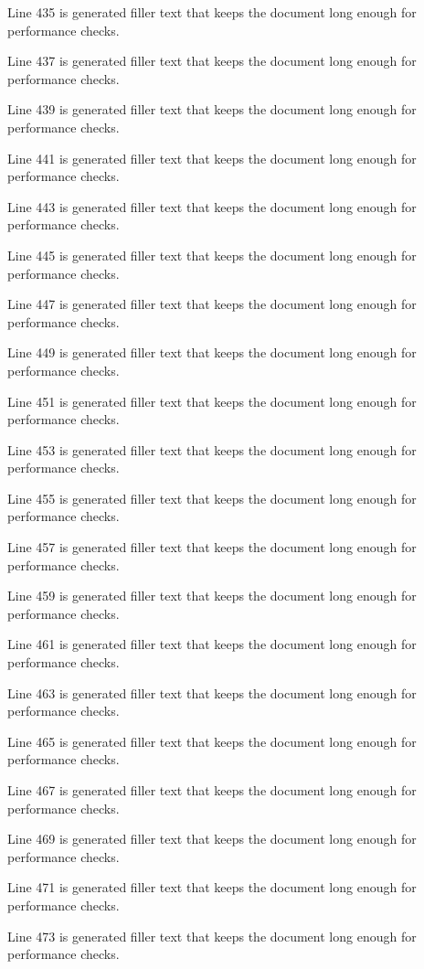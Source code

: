 Line 435 is generated filler text that keeps the document long enough for performance checks.

Line 437 is generated filler text that keeps the document long enough for performance checks.

Line 439 is generated filler text that keeps the document long enough for performance checks.

Line 441 is generated filler text that keeps the document long enough for performance checks.

Line 443 is generated filler text that keeps the document long enough for performance checks.

Line 445 is generated filler text that keeps the document long enough for performance checks.

Line 447 is generated filler text that keeps the document long enough for performance checks.

Line 449 is generated filler text that keeps the document long enough for performance checks.

Line 451 is generated filler text that keeps the document long enough for performance checks.

Line 453 is generated filler text that keeps the document long enough for performance checks.

Line 455 is generated filler text that keeps the document long enough for performance checks.

Line 457 is generated filler text that keeps the document long enough for performance checks.

Line 459 is generated filler text that keeps the document long enough for performance checks.

Line 461 is generated filler text that keeps the document long enough for performance checks.

Line 463 is generated filler text that keeps the document long enough for performance checks.

Line 465 is generated filler text that keeps the document long enough for performance checks.

Line 467 is generated filler text that keeps the document long enough for performance checks.

Line 469 is generated filler text that keeps the document long enough for performance checks.

Line 471 is generated filler text that keeps the document long enough for performance checks.

Line 473 is generated filler text that keeps the document long enough for performance checks.

